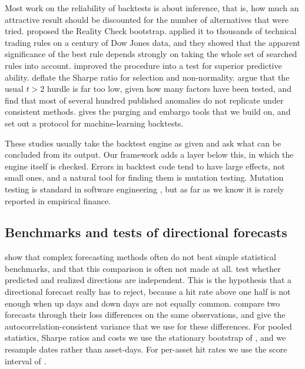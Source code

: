 \documentclass[preprint,12pt,authoryear,a4paper]{elsarticle}
\begin{document}
Most work on the reliability of backtests is about inference, that is, how much an
attractive result should be discounted for the number of alternatives that were
tried. \citet{white2000reality} proposed the Reality Check bootstrap.
\citet{sullivan1999data} applied it to thousands of technical trading rules on a
century of Dow Jones data, and they showed that the apparent significance of the
best rule depends strongly on taking the whole set of searched rules into account.
\citet{hansen2005test} improved the procedure into a test for superior predictive
ability. \citet{bailey2014deflated} deflate the Sharpe ratio for selection and
non-normality. \citet{harvey2016cross} argue that the usual $t>2$ hurdle is far too
low, given how many factors have been tested, and \citet{hou2020replicating} find
that most of several hundred published anomalies do not replicate under consistent
methods. \citet{lopezdeprado2018advances} gives the purging and embargo tools that
we build on, and \citet{arnott2019backtesting} set out a protocol for
machine-learning backtests.

These studies usually take the backtest engine as given and ask what can be
concluded from its output. Our framework adds a layer below this, in which the
engine itself is checked. Errors in backtest code tend to have large effects, not
small ones, and a natural tool for finding them is mutation testing. Mutation
testing is standard in software engineering \citep{jia2011analysis}, but as far as
we know it is rarely reported in empirical finance.

\subsection{Benchmarks and tests of directional forecasts}

\citet{makridakis2018statistical} show that complex forecasting methods often do
not beat simple statistical benchmarks, and that this comparison is often not made
at all. \citet{pesaran1992simple} test whether predicted and realized directions
are independent. This is the hypothesis that a directional forecast really has to
reject, because a hit rate above one half is not enough when up days and down days
are not equally common. \citet{diebold1995comparing} compare two forecasts through
their loss differences on the same observations, and \citet{newey1987simple} give
the autocorrelation-consistent variance that we use for these differences. For
pooled statistics, Sharpe ratios and costs we use the stationary bootstrap of
\citet{politis1994stationary}, and we resample dates rather than asset-days. For
per-asset hit rates we use the score interval of \citet{wilson1927probable}.
\end{document}
